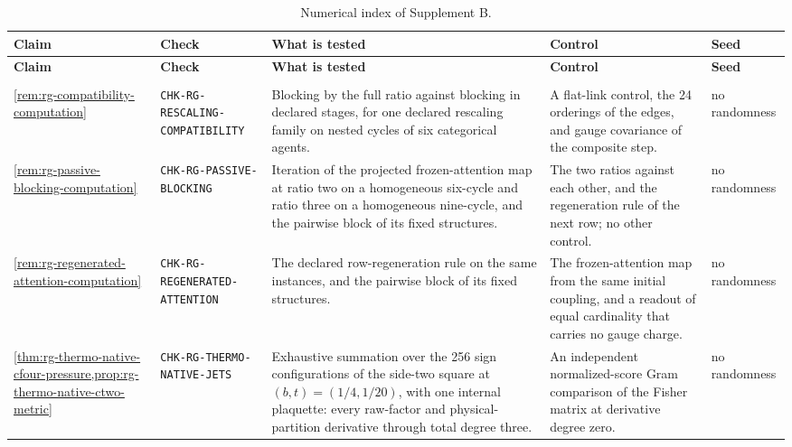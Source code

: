 {\footnotesize
\renewcommand{\arraystretch}{1.12}
\begin{longtable}{@{}>{\raggedright\arraybackslash}p{}
>{\raggedright\arraybackslash}p{}
>{\raggedright\arraybackslash}p{}
>{\raggedright\arraybackslash}p{}
>{\raggedright\arraybackslash}p{}@{}}
\caption{Numerical index of Supplement B.}
\label{tab:base-numerical}\\
\toprule
\textbf{Claim} & \textbf{Check} & \textbf{What is tested} & \textbf{Control} & \textbf{Seed} \\
\midrule
\endfirsthead
\toprule
\textbf{Claim} & \textbf{Check} & \textbf{What is tested} & \textbf{Control} & \textbf{Seed} \\
\midrule
\endhead
\midrule
\multicolumn{5}{r@{}}{\emph{continued on the next page}} \\
\endfoot
\bottomrule
\endlastfoot
\cref{rem:rg-compatibility-computation} & \texttt{CHK-RG-\allowbreak RESCALING-\allowbreak COMPATIBILITY} & Blocking by the full ratio against blocking in declared stages, for one declared rescaling family on nested cycles of six categorical agents. & A flat-link control, the 24 orderings of the edges, and gauge covariance of the composite step. & no randomness \\
\cref{rem:rg-passive-blocking-computation} & \texttt{CHK-RG-\allowbreak PASSIVE-\allowbreak BLOCKING} & Iteration of the projected frozen-attention map at ratio two on a homogeneous six-cycle and ratio three on a homogeneous nine-cycle, and the pairwise block of its fixed structures. & The two ratios against each other, and the regeneration rule of the next row; no other control. & no randomness \\
\cref{rem:rg-regenerated-attention-computation} & \texttt{CHK-RG-\allowbreak REGENERATED-\allowbreak ATTENTION} & The declared row-regeneration rule on the same instances, and the pairwise block of its fixed structures. & The frozen-attention map from the same initial coupling, and a readout of equal cardinality that carries no gauge charge. & no randomness \\
\cref{thm:rg-thermo-native-cfour-pressure,prop:rg-thermo-native-ctwo-metric} & \texttt{CHK-RG-\allowbreak THERMO-\allowbreak NATIVE-\allowbreak JETS} & Exhaustive summation over the 256 sign configurations of the side-two square at $(b,t)=(1/4,1/20)$, with one internal plaquette: every raw-factor and physical-partition derivative through total degree three. & An independent normalized-score Gram comparison of the Fisher matrix at derivative degree zero. & no randomness \\

\end{longtable}}
